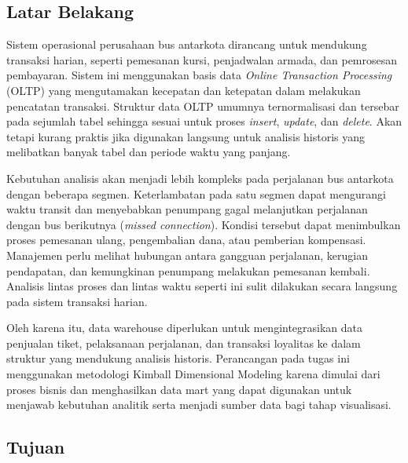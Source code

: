 \subsection{Latar Belakang}

Sistem operasional perusahaan bus antarkota dirancang untuk mendukung transaksi
harian, seperti pemesanan kursi, penjadwalan armada, dan pemrosesan pembayaran.
Sistem ini menggunakan basis data \textit{Online Transaction Processing} (OLTP)
yang mengutamakan kecepatan dan ketepatan dalam melakukan pencatatan transaksi. Struktur data OLTP
umumnya ternormalisasi dan tersebar pada sejumlah tabel sehingga sesuai untuk proses
\textit{insert}, \textit{update}, dan \textit{delete}. Akan tetapi kurang praktis jika
digunakan langsung untuk analisis historis yang melibatkan banyak tabel dan periode
waktu yang panjang.

Kebutuhan analisis akan menjadi lebih kompleks pada perjalanan bus antarkota dengan
beberapa segmen. Keterlambatan pada satu segmen dapat mengurangi waktu transit dan
menyebabkan penumpang gagal melanjutkan perjalanan dengan bus berikutnya
(\textit{missed connection}). Kondisi tersebut dapat menimbulkan proses pemesanan
ulang, pengembalian dana, atau pemberian kompensasi. Manajemen perlu melihat hubungan
antara gangguan perjalanan, kerugian pendapatan, dan kemungkinan penumpang melakukan
pemesanan kembali. Analisis lintas proses dan lintas waktu seperti ini sulit dilakukan
secara langsung pada sistem transaksi harian.

Oleh karena itu, data warehouse diperlukan untuk mengintegrasikan data penjualan
tiket, pelaksanaan perjalanan, dan transaksi loyalitas ke dalam struktur yang
mendukung analisis historis. Perancangan pada tugas ini menggunakan metodologi
Kimball Dimensional Modeling karena dimulai dari proses bisnis dan menghasilkan
data mart yang dapat digunakan untuk menjawab kebutuhan analitik serta menjadi
sumber data bagi tahap visualisasi.

\subsection{Tujuan}

